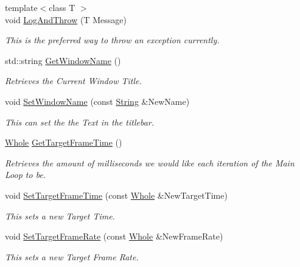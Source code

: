 \begin{DoxyCompactItemize}
{\footnotesize template$<$class T $>$ }\\void \hyperlink{classphys_1_1World_a88e6bdee6b972111b6804ca746738c50}{LogAndThrow} (T Message)
\begin{DoxyCompactList}\small\item\em This is the preferred way to throw an exception currently. \item\end{DoxyCompactList}\item 
std::string \hyperlink{classphys_1_1World_a1f0139bbc9561bcf18844be25e4adc73}{GetWindowName} ()
\begin{DoxyCompactList}\small\item\em Retrieves the Current Window Title. \item\end{DoxyCompactList}\item 
void \hyperlink{classphys_1_1World_acd0dff342c08fe3008226488b7c53d97}{SetWindowName} (const \hyperlink{namespacephys_aa03900411993de7fbfec4789bc1d392e}{String} \&NewName)
\begin{DoxyCompactList}\small\item\em This can set the the Text in the titlebar. \item\end{DoxyCompactList}\item 
\hyperlink{namespacephys_a460f6bc24c8dd347b05e0366ae34f34a}{Whole} \hyperlink{classphys_1_1World_aa063ace52be484c7b03ec5859453f48b}{GetTargetFrameTime} ()
\begin{DoxyCompactList}\small\item\em Retrieves the amount of milliseconds we would like each iteration of the Main Loop to be. \item\end{DoxyCompactList}\item 
void \hyperlink{classphys_1_1World_ad95b5a5ad73e0a05826b5bd834876333}{SetTargetFrameTime} (const \hyperlink{namespacephys_a460f6bc24c8dd347b05e0366ae34f34a}{Whole} \&NewTargetTime)
\begin{DoxyCompactList}\small\item\em This sets a new Target Time. \item\end{DoxyCompactList}\item 
void \hyperlink{classphys_1_1World_a76dfcde35392291aafd6eb1a64b3c95c}{SetTargetFrameRate} (const \hyperlink{namespacephys_a460f6bc24c8dd347b05e0366ae34f34a}{Whole} \&NewFrameRate)
\begin{DoxyCompactList}\small\item\em This sets a new Target Frame Rate. \item\end{DoxyCompactList}\item 

\end{DoxyCompactItemize}
